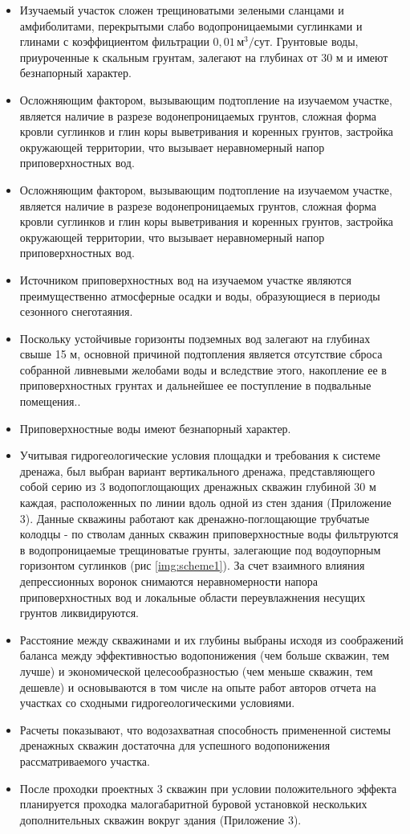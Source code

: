\documentclass[a4paper,12pt]{article} %
\begin{document}
\begin{itemize}

\item Изучаемый участок сложен  трещиноватыми зелеными сланцами и амфиболитами, перекрытыми слабо водопроницаемыми суглинками и глинами с коэффициентом фильтрации $0,01 \, м^3/сут$. Грунтовые воды, приуроченные к скальным грунтам, залегают на глубинах от 30 м и имеют безнапорный характер.
\item Осложняющим фактором, вызывающим подтопление на изучаемом участке, является наличие в разрезе водонепроницаемых грунтов, сложная форма кровли суглинков и глин коры выветривания и коренных грунтов, застройка окружающей территории, что вызывает неравномерный напор приповерхностных вод.
\item Осложняющим фактором, вызывающим подтопление на изучаемом участке, является наличие в разрезе водонепроницаемых грунтов, сложная форма кровли суглинков и глин коры выветривания и коренных грунтов, застройка окружающей территории, что вызывает неравномерный напор приповерхностных вод.
\item Источником приповерхностных вод на изучаемом участке являются преимущественно атмосферные осадки и воды, образующиеся в периоды сезонного снеготаяния.
\item Поскольку устойчивые горизонты подземных вод залегают на глубинах свыше 15 м, основной причиной подтопления является отсутствие сброса собранной ливневыми желобами воды и вследствие этого, накопление ее в приповерхностных грунтах и дальнейшее ее поступление в подвальные помещения..
\item Приповерхностные воды имеют безнапорный характер.
\item Учитывая гидрогеологические условия площадки и требования к системе дренажа, был выбран вариант вертикального дренажа, представляющего собой серию из 3 водопоглощающих дренажных скважин глубиной 30 м каждая, расположенных по линии вдоль одной из стен здания (Приложение 3). Данные скважины работают как дренажно-поглощающие трубчатые колодцы - по стволам данных скважин приповерхностные воды фильтруются в водопроницаемые трещиноватые грунты, залегающие под  водоупорным горизонтом суглинков (рис \ref{img:scheme1}). За счет взаимного влияния депрессионных воронок снимаются неравномерности напора приповерхностных вод и локальные области переувлажнения несущих грунтов ликвидируются. 
\item Расстояние между скважинами и их глубины выбраны исходя из соображений баланса между эффективностью водопонижения (чем больше скважин, тем лучше) и экономической целесообразностью (чем меньше скважин, тем дешевле) и основываются в том числе на опыте работ авторов отчета на участках со сходными гидрогеологическими условиями.
\item Расчеты показывают, что водозахватная способность примененной системы дренажных скважин достаточна для успешного водопонижения рассматриваемого участка.
\item После проходки проектных 3 скважин при условии положительного эффекта планируется проходка малогабаритной буровой установкой нескольких дополнительных скважин вокруг здания (Приложение 3).

\end{itemize}
\end{document}
